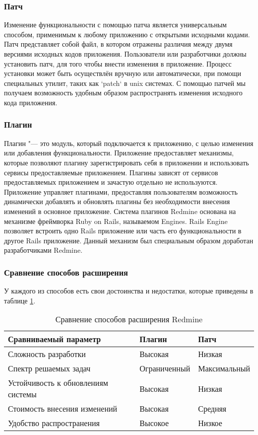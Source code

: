 \subsubsection{Патч}
Изменение функциональности с помощью патча является универсальным способом,
применимым к любому приложению с открытыми исходными кодами. Патч представляет
собой файл, в котором отражены различия между двумя версиями исходных кодов
приложения. Пользователи или разработчики должны установить патч, для того
чтобы внести изменения в приложение. Процесс установки может быть осуществлён
вручную или автоматически, при помощи специальных утилит, таких как `patch` в
unix системах. С помощью патчей мы получаем возможность удобным образом
распространять изменения исходного кода приложения.

\subsubsection{Плагин}
Плагин "--- это модуль, который подключается к приложению, с целью изменения
или добавления функциональности. Приложение предоставляет механизмы, которые
позволяют плагину зарегистрировать себя в приложении и использовать сервисы
предоставляемые приложением. Плагины зависят от сервисов предоставляемых
приложением и зачастую отдельно не используются. Приложение управляет
плагинами, предоставляя пользователям возможность динамически добавлять и
обновлять плагины без необходимости внесения изменений в основное приложение.
Система плагинов Redmine основана на механизме фреймворка Ruby on Rails,
называемом Engines. Rails Engine позволяет встроить одно Rails приложение или
часть его функциональности в другое Rails приложение. Данный механизм был
специальным образом доработан разработчиками Redmine.

\subsubsection{Сравнение способов расширения}
У каждого из способов есть свои достоинства и недостатки, которые приведены в
таблице \ref{comparing_extensions}.
\begin{table}[hb!]
\small
\centering
\begin{tabular}{ 
|>{\centering\arraybackslash}m{}
|>{\centering\arraybackslash}m{}
|>{\centering\arraybackslash}m{}|}
\hline
\textbf{Сравниваемый параметр} & \textbf{Плагин} & \textbf{Патч}\\
\hline
Сложность разработки & Высокая & Низкая \\
\hline
Спектр решаемых задач & Ограниченный & Максимальный\\
\hline
Устойчивость к обновлениям системы & Высокая & Низкая \\
\hline
Стоимость внесения изменений & Высокая & Средняя \\
\hline
Удобство распространения & Высокое & Низкое \\
\hline
\end{tabular}
\caption{Сравнение способов расширения Redmine}
\label{comparing_extensions}
\end{table}


